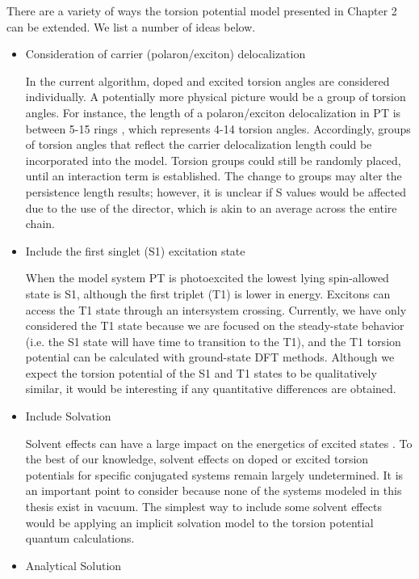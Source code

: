 There are a variety of ways the torsion potential model presented in Chapter 2 can be extended. We list a number of ideas below.

\begin{itemize}
  \item Consideration of carrier (polaron/exciton) delocalization

  In the current algorithm, doped and excited torsion angles are considered individually. A potentially more physical picture would be a group of torsion angles. For instance, the length of a polaron/exciton delocalization in PT is between 5-15 rings \cite{Salzner2014, Roseli2017, Busby2011}, which represents 4-14 torsion angles. Accordingly, groups of torsion angles that reflect the carrier delocalization length could be incorporated into the model. Torsion groups could still be randomly placed, until an interaction term is established. The change to groups may alter the persistence length results; however, it is unclear if S values would be affected due to the use of the director, which is akin to an average across the entire chain.

  \item Include the first singlet (S1) excitation state

  When the model system PT is photoexcited the lowest lying spin-allowed state is S1, although the first triplet (T1) is lower in energy. Excitons can access the T1 state through an intersystem crossing. Currently, we have only considered the T1 state because we are focused on the steady-state behavior (i.e. the S1 state will have time to transition to the T1), and the T1 torsion potential can be calculated with ground-state DFT methods. Although we expect the torsion potential of the S1 and T1 states to be qualitatively similar, it would be interesting if any quantitative differences are obtained.

  \item Include Solvation

  Solvent effects can have a large impact on the energetics of excited states \cite{Blau2018}. To the best of our knowledge, solvent effects on doped or excited torsion potentials for specific conjugated systems remain largely undetermined. It is an important point to consider because none of the systems modeled in this thesis exist in vacuum. The simplest way to include some solvent effects would be applying an implicit solvation model to the torsion potential quantum calculations.

  \item Analytical Solution


\end{itemize}
